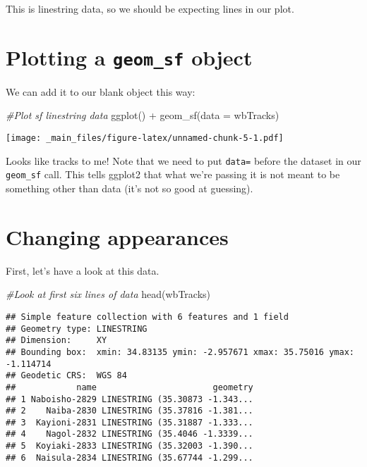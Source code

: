 \documentclass[
]{book}
\newenvironment{Shaded}{\begin{snugshade}}{\end{snugshade}}
\newcommand{\AttributeTok}[1]{\textcolor[rgb]{0.77,0.63,0.00}{#1}}
\newcommand{\CommentTok}[1]{\textcolor[rgb]{0.56,0.35,0.01}{\textit{#1}}}
\newcommand{\FunctionTok}[1]{\textcolor[rgb]{0.00,0.00,0.00}{#1}}
\newcommand{\NormalTok}[1]{#1}
\newcommand{\SpecialCharTok}[1]{\textcolor[rgb]{0.00,0.00,0.00}{#1}}
\begin{document}
This is linestring data, so we should be expecting lines in our plot.

\hypertarget{plotting-a-geom_sf-object}{%
\section{\texorpdfstring{Plotting a \texttt{geom\_sf} object}{Plotting a geom\_sf object}}\label{plotting-a-geom_sf-object}}

We can add it to our blank object this way:

\begin{Shaded}
\begin{Highlighting}[]
\CommentTok{\#Plot sf linestring data}
\FunctionTok{ggplot}\NormalTok{() }\SpecialCharTok{+} 
  \FunctionTok{geom\_sf}\NormalTok{(}\AttributeTok{data =}\NormalTok{ wbTracks)}
\end{Highlighting}
\end{Shaded}

\texttt{[image: \_main\_files/figure-latex/unnamed-chunk-5-1.pdf]}

Looks like tracks to me! Note that we need to put \texttt{data=} before the dataset in our \texttt{geom\_sf} call. This tells ggplot2 that what we're passing it is not meant to be something other than data (it's not so good at guessing).

\hypertarget{changing-appearances}{%
\section{Changing appearances}\label{changing-appearances}}

First, let's have a look at this data.

\begin{Shaded}
\begin{Highlighting}[]
\CommentTok{\#Look at first six lines of data}
\FunctionTok{head}\NormalTok{(wbTracks)}
\end{Highlighting}
\end{Shaded}

\begin{verbatim}
## Simple feature collection with 6 features and 1 field
## Geometry type: LINESTRING
## Dimension:     XY
## Bounding box:  xmin: 34.83135 ymin: -2.957671 xmax: 35.75016 ymax: -1.114714
## Geodetic CRS:  WGS 84
##            name                       geometry
## 1 Naboisho-2829 LINESTRING (35.30873 -1.343...
## 2    Naiba-2830 LINESTRING (35.37816 -1.381...
## 3  Kayioni-2831 LINESTRING (35.31887 -1.333...
## 4    Nagol-2832 LINESTRING (35.4046 -1.3339...
## 5  Koyiaki-2833 LINESTRING (35.32003 -1.390...
## 6  Naisula-2834 LINESTRING (35.67744 -1.299...
\end{verbatim}
\end{document}
